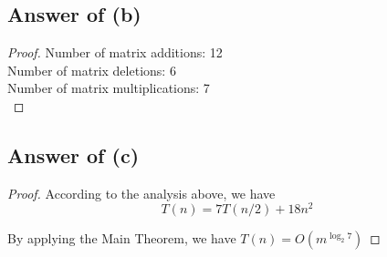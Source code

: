 \documentclass[letterpaper,11pt\iffalse ,draft\fi]{article}
\begin{document}
\subsection*{Answer of (b)}
\begin{proof}
Number of matrix additions: 12 \\
Number of matrix deletions: 6 \\
Number of matrix multiplications: 7 \\
\end{proof}


\subsection*{Answer of (c)}
\begin{proof}
According to the analysis above, we have $$T(n) = 7T(n/2) + 18n^2$$

By applying the Main Theorem, we have $T(n) = O(m^{\log_2 7})$
\end{proof}
\end{document}
